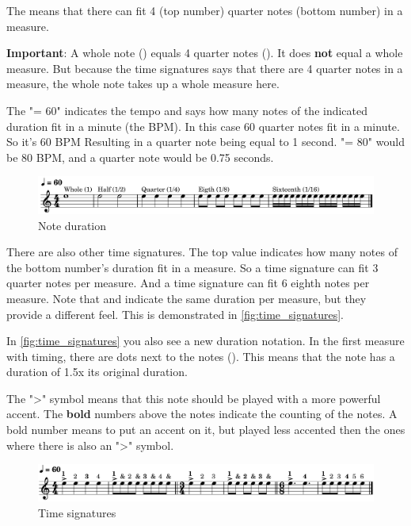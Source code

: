 The  means that there can fit 4 (top number) quarter notes (bottom number) in a measure.

\textbf{Important}: A whole note (\wholeNote) equals 4 quarter notes (\quarterNote). It does \textbf{not} equal a whole measure. But because the time signatures says that there are 4 quarter notes in a measure, the whole note takes up a whole measure here.\newline

The "\quarterNote = 60" indicates the tempo and says how many notes of the indicated duration fit in a minute (the BPM). In this case 60 quarter notes fit in a minute. So it's 60 BPM Resulting in a quarter note being equal to 1 second. "\quarterNote = 80" would be 80 BPM, and a quarter note would be 0.75 seconds.

\begin{figure}[h]
	\centering
	\includegraphics[width=\textwidth]{../../MuseScore/Guitar/MusicNotation/NoteDurations_Basic.png}
	\caption{Note duration}
	\label{fig:note_duration_basic}
\end{figure}

There are also other time signatures. The top value indicates how many notes of the bottom number's duration fit in a measure. So a  time signature can fit 3 quarter notes per measure. And a  time signature can fit 6 eighth notes per measure. Note that  and  indicate the same duration per measure, but they provide a different feel. This is demonstrated in \autoref{fig:time_signatures}.

In \autoref{fig:time_signatures} you also see a new duration notation. In the first measure with  timing, there are dots next to the notes (\quarterNoteDottedDown). This means that the note has a duration of 1.5x its original duration.

The ">" symbol means that this note should be played with a more powerful accent. The \textbf{bold} numbers above the notes indicate the counting of the notes. A bold number means to put an accent on it, but played less accented then the ones where there is also an ">" symbol.

\begin{figure}[h]
	\centering
	\includegraphics[width=\textwidth]{../../MuseScore/Guitar/MusicNotation/TimeSignature.png}
	\caption{Time signatures}
	\label{fig:time_signatures}
\end{figure}

